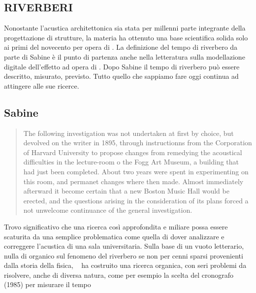 
\begin{refsection}

\section{RIVERBERI}
\thispagestyle{empty}

Nonostante l'acustica architettonica sia stata per millenni parte integrante
della progettazione di strutture, la materia ha ottenuto una base
scientifica solida solo ai primi del novecento per opera di \ws. \cite{ws:rev}
La definizione del tempo di riverbero da parte di Sabine è il punto di partenza
anche nella letteratura sulla modellazione digitale dell'effetto ad opera di
\ms. \cite{ms:rev62, ms:rev64} Dopo Sabine il tempo di riverbero può essere
descritto, misurato, previsto. Tutto quello che sappiamo fare oggi continua ad
attingere alle sue ricerce.

\subsection{Sabine}

\begin{quote}
  The following investigation was not undertaken at first by choice, but devolved
  on the writer in 1895, through instructionns from the Corporation of Harvard
  University to propose changes from remedying the acoustical difficulties in
  the lecture-room o the Fogg Art Museum, a building that had just been completed.
  About two years were spent in experimenting on this room, and permanet changes
  where then made. Almost immediately afterward it become certain that a new
  Boston Music Hall would be erected, and the questions arising in the
  consideration of its plans forced a not unwelcome continuance of the general
  investigation. \cite{ws:rev}
\end{quote}

Trovo significativo che una ricerca così approfondita e miliare possa essere
scaturita da una semplice problematica come quella di dover analizzare e
correggere l'acustica di una sala universitaria. Sulla base di un vuoto letterario,
nulla di organico sul fenomeno del riverbero se non per cenni sparsi provenienti
dalla storia della fisica, \ms~ ha costruito una ricerca organica, con seri
problemi da risolvere, anche di diversa natura, come per esempio la scelta del
cronografo (1985) per misurare il tempo


\end{refsection}
